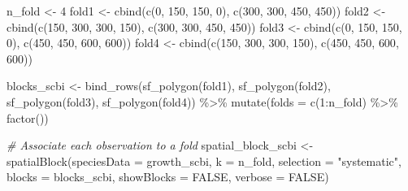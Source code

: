 \documentclass[12pt]{article}
\newenvironment{Shaded}{\begin{snugshade}}{\end{snugshade}}
\newcommand{\AttributeTok}[1]{\textcolor[rgb]{0.77,0.63,0.00}{#1}}
\newcommand{\CommentTok}[1]{\textcolor[rgb]{0.56,0.35,0.01}{\textit{#1}}}
\newcommand{\ConstantTok}[1]{\textcolor[rgb]{0.00,0.00,0.00}{#1}}
\newcommand{\DecValTok}[1]{\textcolor[rgb]{0.00,0.00,0.81}{#1}}
\newcommand{\FunctionTok}[1]{\textcolor[rgb]{0.00,0.00,0.00}{#1}}
\newcommand{\NormalTok}[1]{#1}
\newcommand{\OtherTok}[1]{\textcolor[rgb]{0.56,0.35,0.01}{#1}}
\newcommand{\SpecialCharTok}[1]{\textcolor[rgb]{0.00,0.00,0.00}{#1}}
\newcommand{\StringTok}[1]{\textcolor[rgb]{0.31,0.60,0.02}{#1}}
\begin{document}
\begin{Shaded}
\begin{Highlighting}[]
\NormalTok{n\_fold }\OtherTok{\textless{}{-}} \DecValTok{4}
\NormalTok{fold1 }\OtherTok{\textless{}{-}} \FunctionTok{cbind}\NormalTok{(}\FunctionTok{c}\NormalTok{(}\DecValTok{0}\NormalTok{, }\DecValTok{150}\NormalTok{, }\DecValTok{150}\NormalTok{, }\DecValTok{0}\NormalTok{), }\FunctionTok{c}\NormalTok{(}\DecValTok{300}\NormalTok{, }\DecValTok{300}\NormalTok{, }\DecValTok{450}\NormalTok{, }\DecValTok{450}\NormalTok{))}
\NormalTok{fold2 }\OtherTok{\textless{}{-}} \FunctionTok{cbind}\NormalTok{(}\FunctionTok{c}\NormalTok{(}\DecValTok{150}\NormalTok{, }\DecValTok{300}\NormalTok{, }\DecValTok{300}\NormalTok{, }\DecValTok{150}\NormalTok{), }\FunctionTok{c}\NormalTok{(}\DecValTok{300}\NormalTok{, }\DecValTok{300}\NormalTok{, }\DecValTok{450}\NormalTok{, }\DecValTok{450}\NormalTok{))}
\NormalTok{fold3 }\OtherTok{\textless{}{-}} \FunctionTok{cbind}\NormalTok{(}\FunctionTok{c}\NormalTok{(}\DecValTok{0}\NormalTok{, }\DecValTok{150}\NormalTok{, }\DecValTok{150}\NormalTok{, }\DecValTok{0}\NormalTok{), }\FunctionTok{c}\NormalTok{(}\DecValTok{450}\NormalTok{, }\DecValTok{450}\NormalTok{, }\DecValTok{600}\NormalTok{, }\DecValTok{600}\NormalTok{))}
\NormalTok{fold4 }\OtherTok{\textless{}{-}} \FunctionTok{cbind}\NormalTok{(}\FunctionTok{c}\NormalTok{(}\DecValTok{150}\NormalTok{, }\DecValTok{300}\NormalTok{, }\DecValTok{300}\NormalTok{, }\DecValTok{150}\NormalTok{), }\FunctionTok{c}\NormalTok{(}\DecValTok{450}\NormalTok{, }\DecValTok{450}\NormalTok{, }\DecValTok{600}\NormalTok{, }\DecValTok{600}\NormalTok{))}

\NormalTok{blocks\_scbi }\OtherTok{\textless{}{-}} \FunctionTok{bind\_rows}\NormalTok{(}\FunctionTok{sf\_polygon}\NormalTok{(fold1), }\FunctionTok{sf\_polygon}\NormalTok{(fold2), }\FunctionTok{sf\_polygon}\NormalTok{(fold3),}
    \FunctionTok{sf\_polygon}\NormalTok{(fold4)) }\SpecialCharTok{\%\textgreater{}\%}
    \FunctionTok{mutate}\NormalTok{(}\AttributeTok{folds =} \FunctionTok{c}\NormalTok{(}\DecValTok{1}\SpecialCharTok{:}\NormalTok{n\_fold) }\SpecialCharTok{\%\textgreater{}\%}
        \FunctionTok{factor}\NormalTok{())}

\CommentTok{\# Associate each observation to a fold}
\NormalTok{spatial\_block\_scbi }\OtherTok{\textless{}{-}} \FunctionTok{spatialBlock}\NormalTok{(}\AttributeTok{speciesData =}\NormalTok{ growth\_scbi, }\AttributeTok{k =}\NormalTok{ n\_fold,}
    \AttributeTok{selection =} \StringTok{"systematic"}\NormalTok{, }\AttributeTok{blocks =}\NormalTok{ blocks\_scbi, }\AttributeTok{showBlocks =} \ConstantTok{FALSE}\NormalTok{, }\AttributeTok{verbose =} \ConstantTok{FALSE}\NormalTok{)}


\end{Highlighting}
\end{Shaded}
\end{document}
